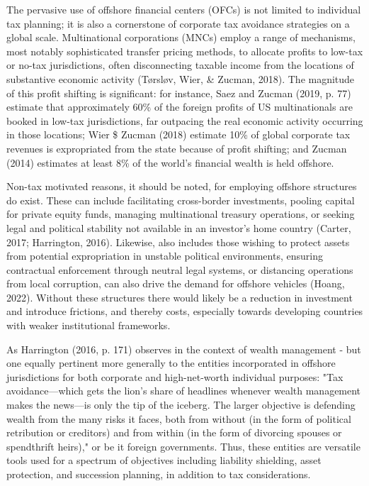 The pervasive use of offshore financial centers (OFCs) is not limited to individual tax planning; it is also a cornerstone of corporate tax avoidance strategies on a global scale. Multinational corporations (MNCs) employ a range of mechanisms, most notably sophisticated transfer pricing methods, to allocate profits to low-tax or no-tax jurisdictions, often disconnecting taxable income from the locations of substantive economic activity (Tørsløv, Wier, \& Zucman, 2018). The magnitude of this profit shifting is significant: for instance, Saez and Zucman (2019, p. 77) estimate that approximately 60\% of the foreign profits of US multinationals are booked in low-tax jurisdictions, far outpacing the real economic activity occurring in those locations; Wier \$ Zucman (2018) estimate 10\% of global corporate tax revenues is expropriated from the state because of profit shifting; and Zucman (2014) estimates at least 8\% of the world's financial wealth is held offshore.

Non-tax motivated reasons, it should be noted, for employing offshore structures do exist. These can include facilitating cross-border investments, pooling capital for private equity funds, managing multinational treasury operations, or seeking legal and political stability not available in an investor's home country (Carter, 2017; Harrington, 2016). Likewise, also includes those wishing to protect assets from potential expropriation in unstable political environments, ensuring contractual enforcement through neutral legal systems, or distancing operations from local corruption, can also drive the demand for offshore vehicles (Hoang, 2022). Without these structures there would likely be a reduction in investment and introduce frictions, and thereby costs, especially towards developing countries with weaker institutional frameworks.

As Harrington (2016, p. 171) observes in the context of wealth management - but one equally pertinent more generally to the entities incorporated in offshore jurisdictions for both corporate and high-net-worth individual purposes: "Tax avoidance—which gets the lion’s share of headlines whenever wealth management makes the news—is only the tip of the iceberg. The larger objective is defending wealth from the many risks it faces, both from without (in the form of political retribution or creditors) and from within (in the form of divorcing spouses or spendthrift heirs)," or be it foreign governments. Thus, these entities are versatile tools used for a spectrum of objectives including liability shielding, asset protection, and succession planning, in addition to tax considerations.


